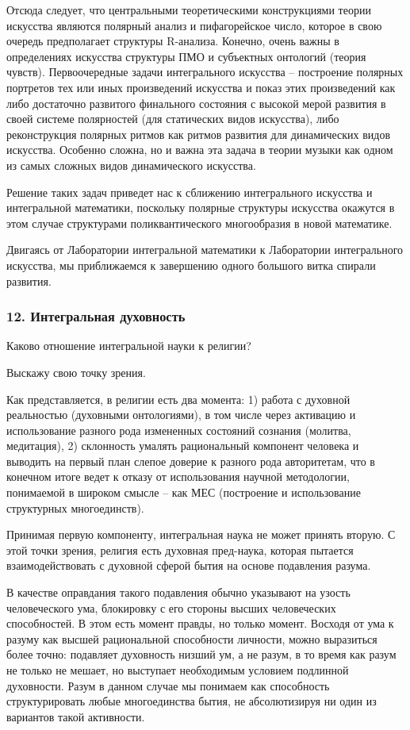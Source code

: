     Отсюда следует, что центральными теоретическими конструкциями теории искусства являются полярный анализ и пифагорейское число, которое в свою очередь предполагает структуры R-анализа. Конечно, очень важны в определениях искусства структуры ПМО и субъектных онтологий (теория чувств). Первоочередные задачи интегрального искусства – построение полярных портретов тех или иных произведений искусства и показ этих произведений как либо достаточно развитого финального состояния с высокой мерой развития в своей системе полярностей (для статических видов искусства), либо реконструкция полярных ритмов как ритмов развития для динамических видов искусства. Особенно сложна, но и важна эта задача в теории музыки как одном из самых сложных видов динамического искусства.

    Решение таких задач приведет нас к сближению интегрального искусства и интегральной математики, поскольку полярные структуры искусства окажутся в этом случае структурами поликвантического многообразия в новой математике.

    Двигаясь от Лаборатории интегральной математики к Лаборатории интегрального искусства, мы приближаемся к завершению одного большого витка спирали развития.

    \subsubsection*{12. Интегральная духовность}
    Каково отношение интегральной науки к религии? 

    Выскажу свою точку зрения.

    Как представляется, в религии есть два момента: 1) работа с духовной реальностью (духовными онтологиями), в том числе через активацию и использование разного рода измененных состояний сознания (молитва, медитация), 2) склонность умалять рациональный компонент человека и выводить на первый план слепое доверие к разного рода авторитетам, что в конечном итоге ведет к отказу от использования научной методологии, понимаемой в широком смысле – как МЕС (построение и использование структурных многоединств).

    Принимая первую компоненту, интегральная наука не может принять вторую. С этой точки зрения, религия есть духовная пред-наука, которая пытается взаимодействовать с духовной сферой бытия на основе подавления разума.

    В качестве оправдания такого подавления обычно указывают на узость человеческого ума, блокировку с его стороны высших человеческих способностей. В этом есть момент правды, но только момент. Восходя от ума к разуму как высшей рациональной способности личности, можно выразиться более точно: подавляет духовность низший ум, а не разум, в то время как разум не только не мешает, но выступает необходимым условием подлинной духовности. Разум в данном случае мы понимаем как способность структурировать любые многоединства бытия, не абсолютизируя ни один из вариантов такой активности.

